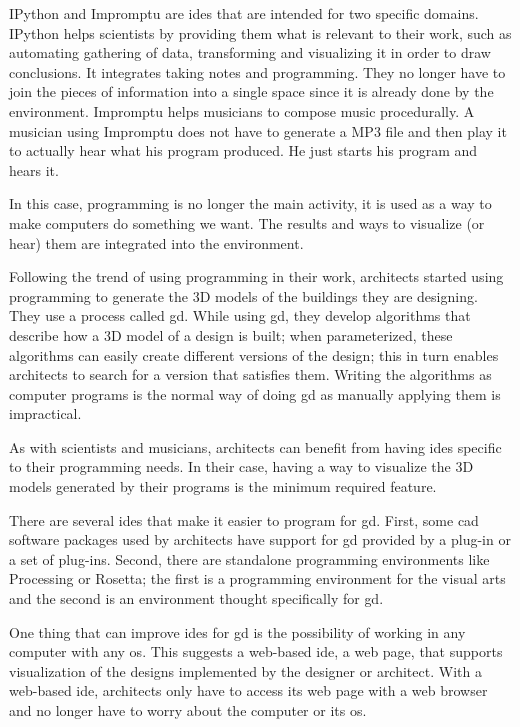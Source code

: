 \documentclass{./llncs2e/llncs}
\begin{document}
	IPython and Impromptu are \acp{ide} that are intended for two specific domains.
	IPython helps scientists by providing them what is relevant to their work, such as automating gathering of data, transforming and visualizing it in order to draw conclusions.
	It integrates taking notes and programming.
	They no longer have to join the pieces of information into a single space since it is already done by the environment.
	Impromptu helps musicians to compose music procedurally.
	A musician using Impromptu does not have to generate a MP3 file and then play it to actually hear what his program produced.
	He just starts his program and hears it.

	In this case, programming is no longer the main activity, it is used as a way to make computers do something we want.
	The results and ways to visualize (or hear) them are integrated into the environment.

	Following the trend of using programming in their work, architects started using programming to generate the 3D models of the buildings they are designing. 
	They use a process called \acl{gd}\cite{terzidis2003expressive,Maeda:2001:DN:559503}.
	While using \ac{gd}, they develop algorithms that describe how a 3D model of a design is built; when parameterized, these algorithms can easily create different versions of the design; this in turn enables architects to search for a version that satisfies them.
	Writing the algorithms as computer programs is the normal way of doing \ac{gd} as manually applying them is impractical.
	
	As with scientists and musicians, architects can benefit from having \acp{ide} specific to their programming needs.
	In their case, having a way to visualize the 3D models generated by their programs is the minimum required feature.

	There are several \acp{ide} that make it easier to program for \ac{gd}. 
	First, some \ac{cad} software packages used by architects have support for \ac{gd} provided by a plug-in or a set of plug-ins.
	Second, there are standalone programming environments like Processing\cite{reas2007processing} or Rosetta\cite{de2012modern}; the first is a programming environment for the visual arts and the second is an environment thought specifically for \ac{gd}.

	One thing that can improve \acp{ide} for \ac{gd} is the possibility of working in any computer with any \ac{os}.
	This suggests a web-based \ac{ide}, a web page, that supports visualization of the designs implemented by the designer or architect.
	With a web-based \ac{ide}, architects only have to access its web page with a web browser and no longer have to worry about the computer or its \ac{os}.
\end{document}
